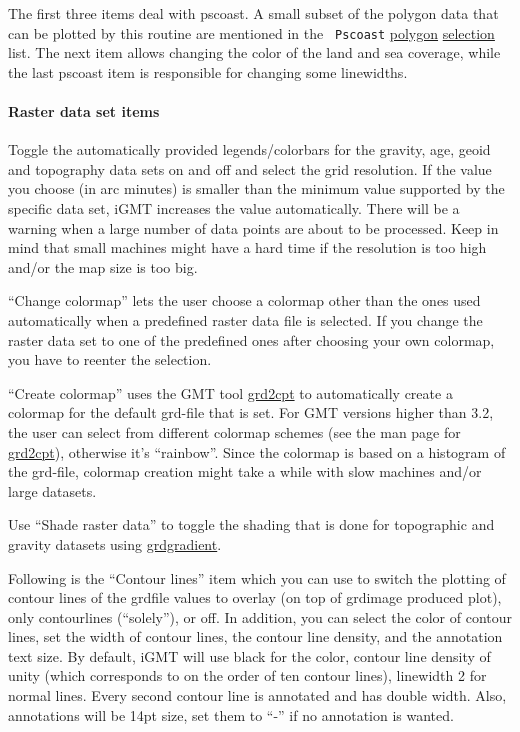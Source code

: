 \documentclass[11pt]{article}
\begin{document}
The first three items deal with pscoast. A small subset of the polygon
data that can be plotted by this routine are mentioned in the {\tt
  Pscoast} \url{polygon} \url{selection} list.  The next item allows
changing the color of the land and sea coverage, while the last
pscoast item is responsible for changing some linewidths.


\paragraph{Raster data set items}
Toggle the automatically provided legends/colorbars for the gravity,
age, geoid and topography data sets on and off and select the grid
resolution. If the value you choose (in arc minutes) is smaller than
the minimum value supported by the specific data set, iGMT increases
the value automatically. There will be a warning when a large number
of data points are about to be processed. Keep in mind that small
machines might have a hard time if the resolution is too high and/or
the map size is too big.

``Change colormap'' lets the user choose a colormap other than the
ones used automatically when a predefined raster data file is
selected. If you change the raster data set to one of the predefined
ones after choosing your own colormap, you have to reenter the
selection.

``Create colormap'' uses the GMT tool \url{grd2cpt} to automatically
create a colormap for the default grd-file that is set.  For GMT
versions higher than 3.2, the user can select from different colormap
schemes (see the man page for \url{grd2cpt}), otherwise it's
``rainbow''. Since the colormap is based on a histogram of the
grd-file, colormap creation might take a while with slow machines
and/or large datasets.

Use ``Shade raster data'' to toggle the shading that is done for
topographic and gravity datasets using \url{grdgradient}.

Following is the ``Contour lines'' item which you can use to switch
the plotting of contour lines of the grdfile values to overlay (on top
of grdimage produced plot), only contourlines (``solely''), or off.
In addition, you can select the color of contour lines, set the width
of contour lines, the contour line density, and the annotation text
size. By default, iGMT will use black for the color, contour line
density of unity (which corresponds to on the order of ten contour
lines), linewidth 2 for normal lines. Every second contour line is
annotated and has double width. Also, annotations will be 14pt size,
set them to ``-'' if no annotation is wanted.
\end{document}
